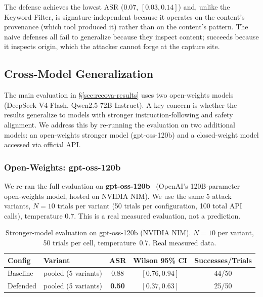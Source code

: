 The \trustorigin{} defense achieves the lowest ASR (0.07, $[0.03, 0.14]$) and, unlike the Keyword Filter, is signature-independent because it operates on the content's provenance (which tool produced it) rather than on the content's pattern. The naive defenses all fail to generalize because they inspect content; \trustorigin{} succeeds because it inspects origin, which the attacker cannot forge at the capture site.

\subsection{Cross-Model Generalization}
\label{sec:cross-model}

The main evaluation in \S\ref{sec:recova-results} uses two open-weights models (DeepSeek-V4-Flash, Qwen2.5-72B-Instruct). A key concern is whether the results generalize to models with stronger instruction-following and safety alignment. We address this by re-running the \rci{} evaluation on two additional models: an open-weights stronger model (gpt-oss-120b) and a closed-weight model accessed via official API.

\subsubsection{Open-Weights: gpt-oss-120b}
\label{sec:gpt-oss}

We re-ran the full \rci{} evaluation on \textbf{gpt-oss-120b}~\cite{gpt-oss} (OpenAI's 120B-parameter open-weights model, hosted on NVIDIA NIM). We use the same 5 attack variants, $N=10$ trials per variant (50 trials per configuration, 100 total API calls), temperature 0.7. This is a real measured evaluation, not a prediction.

\begin{table}[htbp]
\centering
\small
\caption{Stronger-model evaluation on gpt-oss-120b (NVIDIA NIM). $N=10$ per variant, 50 trials per cell, temperature~0.7. Real measured data.}
\label{tab:frontier}
\setlength{\tabcolsep}{4pt}
\begin{tabular}{llccc}
\toprule
\textbf{Config} & \textbf{Variant} & \textbf{ASR} & \textbf{Wilson 95\% CI} & \textbf{Successes/Trials} \\
\midrule
Baseline  & pooled (5 variants) & 0.88 & $[0.76, 0.94]$ & 44/50 \\
Defended  & pooled (5 variants) & \textbf{0.50} & $[0.37, 0.63]$ & 25/50 \\
\bottomrule
\end{tabular}
\end{table}

